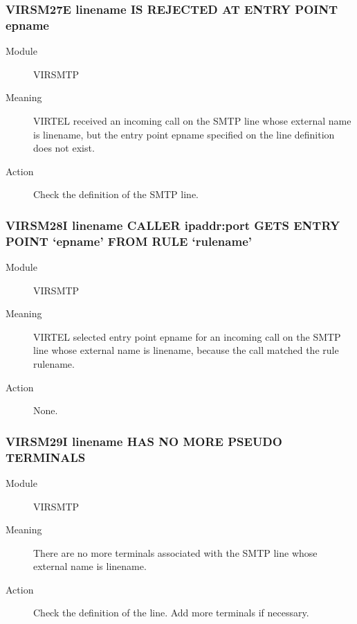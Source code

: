 \documentclass[letterpaper,10pt,english]{sphinxmanual}
\begin{document}
\subsubsection{VIRSM27E linename IS REJECTED AT ENTRY POINT epname}
\label{\detokenize{messages:virsm27e-linename-is-rejected-at-entry-point-epname}}\begin{description}
\item[{Module}] \leavevmode
VIRSMTP

\item[{Meaning}] \leavevmode
VIRTEL received an incoming call on the SMTP line whose external name is linename, but the entry point epname specified on the line definition does not exist.

\item[{Action}] \leavevmode
Check the definition of the SMTP line.

\end{description}


\subsubsection{VIRSM28I linename CALLER ipaddr:port GETS ENTRY POINT ‘epname’ FROM RULE ‘rulename’}
\label{\detokenize{messages:virsm28i-linename-caller-ipaddr-port-gets-entry-point-epname-from-rule-rulename}}\begin{description}
\item[{Module}] \leavevmode
VIRSMTP

\item[{Meaning}] \leavevmode
VIRTEL selected entry point epname for an incoming call on the SMTP line whose external name is linename, because the call matched the rule rulename.

\item[{Action}] \leavevmode
None.

\end{description}


\subsubsection{VIRSM29I linename HAS NO MORE PSEUDO TERMINALS}
\label{\detokenize{messages:virsm29i-linename-has-no-more-pseudo-terminals}}\begin{description}
\item[{Module}] \leavevmode
VIRSMTP

\item[{Meaning}] \leavevmode
There are no more terminals associated with the SMTP line whose external name is linename.

\item[{Action}] \leavevmode
Check the definition of the line. Add more terminals if necessary.

\end{description}
\end{document}
